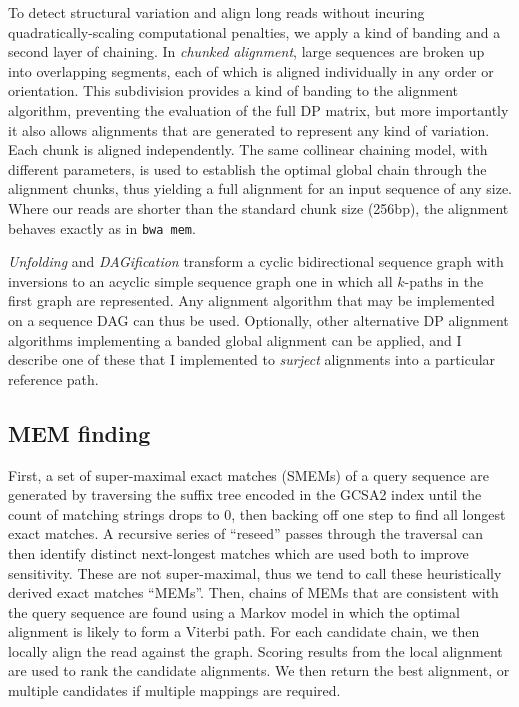 To detect structural variation and align long reads without incuring quadratically-scaling computational penalties, we apply a kind of banding and a second layer of chaining.
In \emph{chunked alignment}, large sequences are broken up into overlapping segments, each of which is aligned individually in any order or orientation.
This subdivision provides a kind of banding to the alignment algorithm, preventing the evaluation of the full DP matrix, but more importantly it also allows alignments that are generated to represent any kind of variation.
Each chunk is aligned independently.
The same collinear chaining model, with different parameters, is used to establish the optimal global chain through the alignment chunks, thus yielding a full alignment for an input sequence of any size.
Where our reads are shorter than the standard chunk size (256bp), the alignment behaves exactly as in {\tt bwa mem}.

\emph{Unfolding} and \emph{DAGification} transform a cyclic bidirectional sequence graph with inversions to an acyclic simple sequence graph one in which all $k$-paths in the first graph are represented.
Any alignment algorithm that may be implemented on a sequence DAG can thus be used.
Optionally, other alternative DP alignment algorithms implementing a banded global alignment can be applied, and I describe one of these that I implemented to \emph{surject} alignments into a particular reference path.

\subsection{MEM finding}
First, a set of super-maximal exact matches (SMEMs) of a query sequence are generated by traversing the suffix tree encoded in the GCSA2 index until the count of matching strings drops to 0, then backing off one step to find all longest exact matches. 
A recursive series of ``reseed'' passes through the traversal can then identify distinct next-longest matches which are used both to improve sensitivity.
These are not super-maximal, thus we tend to call these heuristically derived exact matches ``MEMs''.
Then, chains of MEMs that are consistent with the query sequence are found using a Markov model in which the optimal alignment is likely to form a Viterbi path.
For each candidate chain, we then locally align the read against the graph. 
Scoring results from the local alignment are used to rank the candidate alignments.
We then return the best alignment, or multiple candidates if multiple mappings are required.

